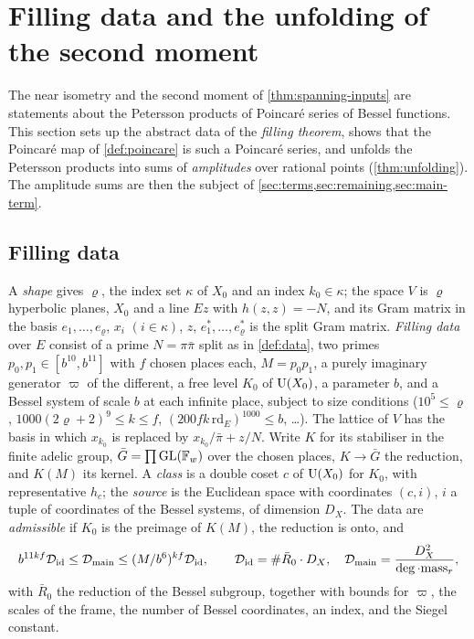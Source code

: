 \section{Filling data and the unfolding of the second moment}\label{sec:unfolding}

The near isometry and the second moment of \cref{thm:spanning-inputs} are statements about the Petersson products of Poincar\'e series of Bessel
functions. This section sets up the abstract data of the \emph{filling theorem}, shows that the Poincar\'e map of \cref{def:poincare} is such a Poincar\'e
series, and unfolds the Petersson products into sums of \emph{amplitudes} over rational points (\cref{thm:unfolding}). The amplitude sums are then
the subject of \cref{sec:terms,sec:remaining,sec:main-term}.

\subsection{Filling data}\label{ss:filling-data}
A \emph{shape} gives $\varrho$, the index set $\kappa$ of $X_0$ and an index $k_0\in\kappa$; the space $V$ is $\varrho$ hyperbolic planes, $X_0$ and a line $Ez$ with $h(z,z)=-N$, and its Gram
matrix in the basis $e_1,\dots,e_\varrho$, $x_i$ $(i\in\kappa)$, $z$, $e^*_1,\dots,e^*_\varrho$ is the split Gram matrix. \emph{Filling data} over $E$ consist of a prime $N=\pi\bar\pi$ split as in
\cref{def:data}, two primes $p_0,p_1\in[b^{10},b^{11}]$ with $f$ chosen places each, $M=p_0p_1$, a purely imaginary generator $\varpi$ of the different, a free level $K_0$ of
$\operatorname{U}(X_0)$, a parameter $b$, and a Bessel system of scale $b$ at each infinite place, subject to size conditions ($10^5\le\varrho$, $1000(2\varrho+2)^9\le k\le f$,
$(200fk\,\mathrm{rd}_E)^{1000}\le b$, \dots). The lattice of $V$ has the basis in which $x_{k_0}$ is replaced by $x_{k_0}/\bar\pi+z/N$. Write $K$ for its stabiliser in the finite adelic
group, $\bar G=\prod\operatorname{GL}(\mathbb{F}_w)$ over the chosen places, $K\to\bar G$ the reduction, and $K(M)$ its kernel. A \emph{class} is a double coset $c$ of $\operatorname{U}(X_0)$ for $K_0$, with
representative $h_c$; the \emph{source} is the Euclidean space with coordinates $(c,i)$, $i$ a tuple of coordinates of the Bessel systems, of dimension $D_X$. The data are
\emph{admissible} if $K_0$ is the preimage of $K(M)$, the reduction is onto, and
\[
  b^{11kf}\mathcal D_{\rm id}\le\mathcal D_{\rm main}\le(M/b^6)^{kf}\mathcal D_{\rm id},\qquad \mathcal D_{\rm id}=\#\bar R_0\cdot D_X,\quad\mathcal D_{\rm main}=\frac{D_X^2}{\deg\cdot\mathrm{mass}_r},
\]
with $\bar R_0$ the reduction of the Bessel subgroup, together with bounds for $\varpi$, the scales of the frame, the number of Bessel coordinates, an index, and the Siegel constant.
